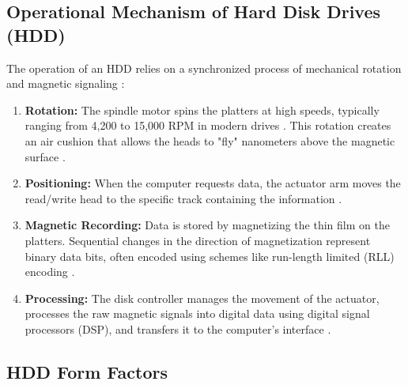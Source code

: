 \subsection{Operational Mechanism of Hard Disk Drives (HDD)}

The operation of an HDD relies on a synchronized process of mechanical rotation and magnetic signaling \cite{gfg_hdd_memory, wiki_hdd}:
\begin{enumerate}
    \item \textbf{Rotation:} The spindle motor spins the platters at high speeds, typically ranging from 4,200 to 15,000 RPM in modern drives \cite{gfg_hdd_memory, wiki_hdd}. This rotation creates an air cushion that allows the heads to "fly" nanometers above the magnetic surface \cite{wiki_hdd}.
    \item \textbf{Positioning:} When the computer requests data, the actuator arm moves the read/write head to the specific track containing the information \cite{gfg_hdd_memory, wiki_hdd}.
    \item \textbf{Magnetic Recording:} Data is stored by magnetizing the thin film on the platters. Sequential changes in the direction of magnetization represent binary data bits, often encoded using schemes like run-length limited (RLL) encoding \cite{wiki_hdd}.
    \item \textbf{Processing:} The disk controller manages the movement of the actuator, processes the raw magnetic signals into digital data using digital signal processors (DSP), and transfers it to the computer's interface \cite{gfg_hdd_memory, wiki_hdd}.
\end{enumerate}

\subsection{HDD Form Factors}

